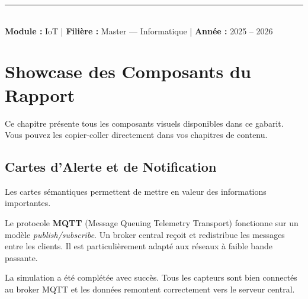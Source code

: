 \documentclass[12pt,a4paper]{report}
\begin{document}
\begin{titlepage}
\begin{center}
        \vfill

        \textcolor{BorderGray}{\rule{\linewidth}{0.4pt}}\\[0.4cm]
        {\normalsize\textbf{Module :} IoT \quad\textcolor{BorderGray}{|}\quad%
         \textbf{Filière :} Master --- Informatique \quad\textcolor{BorderGray}{|}\quad%
         \textbf{Année :} 2025 -- 2026}
        \vspace*{0.6cm}

    \end{center}
\end{titlepage}

{
    \hypersetup{linkcolor=PrimaryBlue}
    \tableofcontents
}

\clearpage

\chapter{Showcase des Composants du Rapport}

Ce chapitre présente tous les composants visuels disponibles dans ce gabarit.
Vous pouvez les copier-coller directement dans vos chapitres de contenu.

\section{Cartes d'Alerte et de Notification}

Les cartes sémantiques permettent de mettre en valeur des informations importantes.

\begin{cardinfo}
    Le protocole \textbf{MQTT} (Message Queuing Telemetry Transport) fonctionne sur un modèle 
    \textit{publish/subscribe}. Un broker central reçoit et redistribue les messages entre les clients.
    Il est particulièrement adapté aux réseaux à faible bande passante.
\end{cardinfo}

\vspace{0.6em}

\begin{cardsuccess}
    La simulation a été complétée avec succès. Tous les capteurs sont bien connectés au broker
    MQTT et les données remontent correctement vers le serveur central.
\end{cardsuccess}
\end{document}
